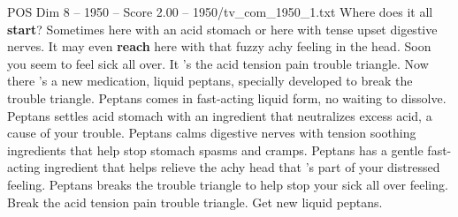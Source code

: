 \begin{textsample}{POS Dim 8 – 1950 – Score 2.00 – 1950/tv\_com\_1950\_1.txt}  \label{ex:f8_pos_008}
Where does it all \textbf{start}?
Sometimes here with an acid stomach or here with tense upset digestive nerves.
It may even \textbf{reach} here with that fuzzy achy feeling in the head.
Soon you seem to feel sick all over.
It 's the acid tension pain trouble triangle.
Now there 's a new medication, liquid peptans, specially developed to break the trouble triangle.
Peptans comes in fast-acting liquid form, no waiting to dissolve.
Peptans settles acid stomach with an ingredient that neutralizes excess acid, a cause of your trouble.
Peptans calms digestive nerves with tension soothing ingredients that help stop stomach spasms and cramps.
Peptans has a gentle fast-acting ingredient that helps relieve the achy head that 's part of your distressed feeling.
Peptans breaks the trouble triangle to help stop your sick all over feeling.
Break the acid tension pain trouble triangle.
Get new liquid peptans.

\end{textsample}
